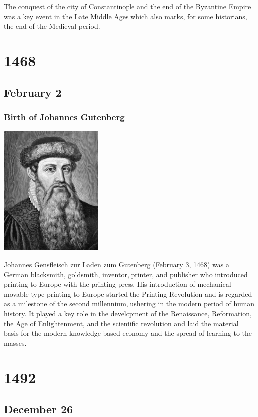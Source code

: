 \documentclass[11pt]{report}
\begin{document}
The conquest of the city of Constantinople and the end of the Byzantine Empire was a key event in the Late Middle Ages which also marks, for some historians, the end of the Medieval period.

\chapter{1468}
\section{February 2}
\subsection{Birth of Johannes Gutenberg}
\vspace{2mm}\begin{center}\includegraphics[width=5cm]{./img/gutenberg.jpg}\end{center}
Johannes Gensfleisch zur Laden zum Gutenberg (February 3, 1468) was a German blacksmith, goldsmith, inventor, printer, and publisher who introduced printing to Europe with the printing press. His introduction of mechanical movable type printing to Europe started the Printing Revolution and is regarded as a milestone of the second millennium, ushering in the modern period of human history. It played a key role in the development of the Renaissance, Reformation, the Age of Enlightenment, and the scientific revolution and laid the material basis for the modern knowledge-based economy and the spread of learning to the masses.

\chapter{1492}
\section{December 26}
\end{document}
